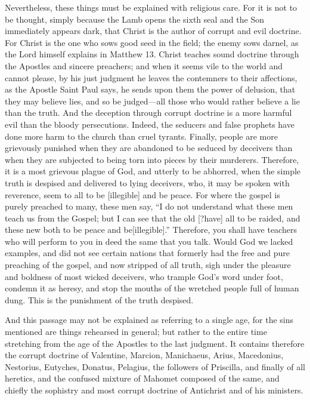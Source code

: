 Nevertheless, these things must be explained with religious care. For it is not to be thought, simply because the Lamb opens the sixth seal and the Son immediately appears dark, that Christ is the author of corrupt and evil doctrine. For Christ is the one who sows good seed in the field; the enemy sows darnel, as the Lord himself explains in Matthew 13. Christ teaches sound doctrine through the Apostles and sincere preachers; and when it seems vile to the world and cannot please, by his just judgment he leaves the contemners to their affections, as the Apostle Saint Paul says, he sends upon them the power of delusion, that they may believe lies, and so be judged—all those who would rather believe a lie than the truth. And the deception through corrupt doctrine is a more harmful evil than the bloody persecutions. Indeed, the seducers and false prophets have done more harm to the church than cruel tyrants. Finally, people are more grievously punished when they are abandoned to be seduced by deceivers than when they are subjected to being torn into pieces by their murderers. Therefore, it is a most grievous plague of God, and utterly to be abhorred, when the simple truth is despised and delivered to lying deceivers, who, it may be spoken with reverence, seem to all to be [illegible] and be peace. For where the gospel is purely preached to many, these men say, “I do not understand what these men teach us from the Gospel; but I can see that the old [?have] all to be raided, and these new both to be peace and be[illegible].” Therefore, you shall have teachers who will perform to you in deed the same that you talk. Would God we lacked examples, and did not see certain nations that formerly had the free and pure preaching of the gospel, and now stripped of all truth, sigh under the pleasure and boldness of most wicked deceivers, who trample God’s word under foot, condemn it as heresy, and stop the mouths of the wretched people full of human dung. This is the punishment of the truth despised.

And this passage may not be explained as referring to a single age, for the sins mentioned are things rehearsed in general; but rather to the entire time stretching from the age of the Apostles to the last judgment. It contains therefore the corrupt doctrine of Valentine, Marcion, Manichaeus, Arius, Macedonius, Nestorius, Eutyches, Donatus, Pelagius, the followers of Priscilla, and finally of all heretics, and the confused mixture of Mahomet composed of the same, and chiefly the sophistry and most corrupt doctrine of Antichrist and of his ministers.

